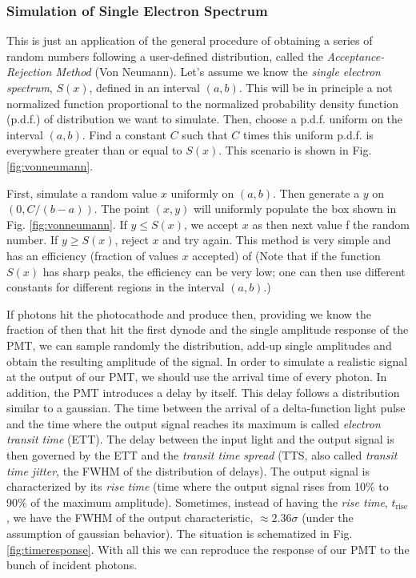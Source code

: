 \subsubsection{Simulation of Single Electron Spectrum}

This is just an application of the general procedure of obtaining a
series of random numbers following a user-defined distribution, called
the \emph{Acceptance-Rejection Method} (Von Neumann). Let's assume we
know the \emph{single electron spectrum}, $S(x)$, defined in an
interval $(a,b)$. This will be in principle a not normalized function
proportional to the normalized probability density function (p.d.f.)
of distribution we want to simulate. Then, choose a p.d.f. uniform on
the interval $(a,b)$. Find a constant $C$ such that $C$ times this
uniform p.d.f.  is everywhere greater than or equal to $S(x)$. This
scenario is shown in Fig. \ref{fig:vonneumann}.

\vonneumannfig

First, simulate a random value $x$ uniformly on $(a,b)$. Then generate
a $y$ on $(0,C/(b-a))$. The point $(x,y)$ will uniformly populate the
box shown in Fig. \ref{fig:vonneumann}. If $y\le S(x)$, we accept $x$
as then next value f the random number. If $y\geq S(x)$, reject $x$
and try again.  This method is very simple and has an efficiency
(fraction of values $x$ accepted) of
%
\vonneumanneffeq
%
(Note that if the function $S(x)$ has sharp peaks, the efficiency can
be very low; one can then use different constants for different
regions in the interval $(a,b)$.)

\timeresponsefig

If \Nphot photons hit the photocathode and produce \Ntrial then,
providing we know the fraction of then that hit the first dynode and
the single \phe amplitude response of the PMT, we can sample randomly
the distribution, add-up single amplitudes and obtain the resulting
amplitude of the signal. In order to simulate a realistic signal at
the output of our PMT, we should use the arrival time of every photon.
In addition, the PMT introduces a delay by itself. This delay follows
a distribution similar to a gaussian. The time between the arrival of
a delta-function light pulse and the time where the output signal
reaches its maximum is called \emph{electron transit time} (ETT). The
delay between the input light and the output signal is then governed
by the ETT and the \emph{transit time spread} (TTS, also called
\emph{transit time jitter}, the FWHM of the distribution of delays).
The output signal is characterized by its \emph{rise time} (time where
the output signal rises from 10\% to 90\% of the maximum amplitude).
Sometimes, instead of having the \emph{rise time},
$t_{\mathrm{rise}}$, we have the FWHM of the output characteristic,
$\approx 2.36\sigma$ (under the assumption of gaussian behavior). The
situation is schematized in Fig.  \ref{fig:timeresponse}. With all
this we can reproduce the response of our PMT to the bunch of incident
photons.


